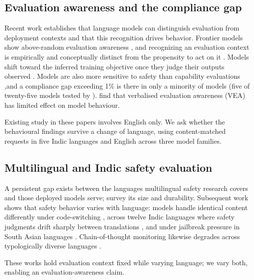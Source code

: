 \documentclass[11pt]{article}
\begin{document}
\subsection{Evaluation awareness and the compliance gap}
 Recent work establishes that language models can distinguish evaluation from deployment contexts and that this recognition drives behavior. Frontier models show above-random evaluation awareness \citep{needham2025largelanguagemodelsknow}, and recognizing an evaluation context is empirically and conceptually distinct from the propensity to act on it \citep{li2026decomposingmeasuringevaluationawareness}. Models shift toward the inferred training objective once they judge their outputs observed \citep{greenblatt2024alignmentfakinglargelanguage}. Models are also more sensitive to safety than capability evaluations \citep{li2026decomposingmeasuringevaluationawareness},and a compliance gap exceeding 1\%  is there in only a minority of models (five of twenty-five models tested by \citep{sheshadri2025languagemodelsfakealignment}). \citep{knecht2026evaluationawarenesslanguagemodels} find that verbalised evaluation awareness (VEA) has limited effect on model behaviour.

Existing study in these papers involves English only. We ask whether the behavioural findings survive a change of language, using content-matched requests in five Indic languages and English across three model families.

 \subsection{Multilingual and Indic safety evaluation }
A persistent gap exists between the languages multilingual safety research covers and those deployed models serve; \citep{yong-etal-2025-state} survey its size and durability. Subsequent work shows that safety behavior varies with language: models handle identical content differently under code-switching \citep{yoo-etal-2025-code}, across twelve Indic languages where safety judgments drift sharply between translations \citep{pattnayak2026indicsafebenchmarkevaluatingmultilingual}, and under jailbreak pressure in South Asian languages \citep{pattnayak-chowdhuri-2026-indicjr}. Chain-of-thought monitoring likewise degrades across typologically diverse languages \citep{onyame2026fragilitychainofthoughtmonitoringtypologically}.

 These works hold evaluation context fixed while varying language; we vary both, enabling an evaluation-awareness claim.
\end{document}
